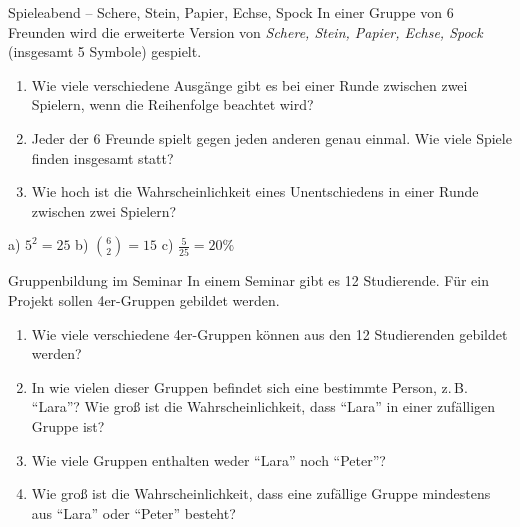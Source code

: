 \documentclass[a4paper,11pt]{article}
\begin{document}
\begin{aufgabebox}{Spieleabend -- Schere, Stein, Papier, Echse, Spock}
    In einer Gruppe von 6 Freunden wird die erweiterte Version von \textit{Schere, Stein, Papier, Echse, Spock} (insgesamt 5 Symbole) gespielt.

    \begin{enumerate}
        \item[a)] Wie viele verschiedene Ausgänge gibt es bei einer Runde zwischen zwei Spielern, wenn die Reihenfolge beachtet wird?
        \item[b)] Jeder der 6 Freunde spielt gegen jeden anderen genau einmal. Wie viele Spiele finden insgesamt statt?
        \item[c)] Wie hoch ist die Wahrscheinlichkeit eines Unentschiedens in einer Runde zwischen zwei Spielern?
    \end{enumerate}

    \begin{loesungsbox}
        a) $5^2 = 25$ \quad
        b) $\binom{6}{2} = 15$ \quad
        c) $\frac{5}{25} = 20\%$
    \end{loesungsbox}
\end{aufgabebox}

\begin{aufgabebox}{Gruppenbildung im Seminar}
    In einem Seminar gibt es 12 Studierende. Für ein Projekt sollen 4er-Gruppen gebildet werden.
    
    \begin{enumerate}
        \item[a)] Wie viele verschiedene 4er-Gruppen können aus den 12 Studierenden gebildet werden?
        \item[b)] In wie vielen dieser Gruppen befindet sich eine bestimmte Person, z.\,B. \enquote{Lara}? Wie groß ist die Wahrscheinlichkeit, dass \enquote{Lara} in einer zufälligen Gruppe ist?
        \item[c)] Wie viele Gruppen enthalten weder \enquote{Lara} noch \enquote{Peter}?
        \item[d)] Wie groß ist die Wahrscheinlichkeit, dass eine zufällige Gruppe mindestens aus \enquote{Lara} oder \enquote{Peter} besteht?
    \end{enumerate}

    \begin{loesungsbox}
         \\[2pt]
    \end{loesungsbox}
\end{aufgabebox}
\end{document}
